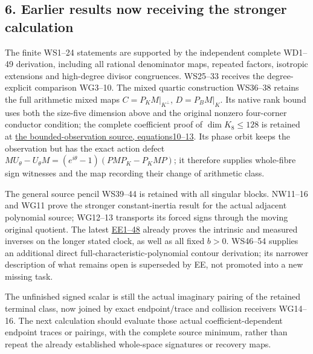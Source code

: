 \documentclass[11pt]{article}
\begin{document}
\subsection{6. Earlier results now receiving the stronger calculation}\label{part1-earlier-results-now-receiving-the-stronger-calculation}

The finite WS1--24 statements are supported by the independent complete WD1--49 derivation, including all rational denominator maps, repeated factors, isotropic extensions and high-degree divisor congruences. WS25--33 receives the degree-explicit comparison WG3--10. The mixed quartic construction WS36--38 retains the full arithmetic mixed maps \(C=P_KM|_{K^\perp}\), \(D=P_BM|_K\). Its native rank bound uses both the size-five dimension above and the original nonzero four-corner conductor condition; the complete coefficient proof of \(\dim K_8\le128\) is retained at \href{https://github.com/KokunoYumeto/zeta-function-research-reader/blob/4ba9285b66af58a6d58fc502a494c1fb45ca5b79/workbenches/splitzero-tandem/continuations/20260922-support-transport/RETAINED_COMPLETE_PROOF_SOURCES.tex\#L332958}{the bounded-observation source, equations10--13}. Its phase orbit keeps the observation but has the exact action defect \(MU_\theta-U_\theta M=(e^{i\theta}-1)(PM P_K-P_KMP)\); it therefore supplies whole-fibre sign witnesses and the map recording their change of arithmetic class.

The general source pencil WS39--44 is retained with all singular blocks. NW11--16 and WG11 prove the stronger constant-inertia result for the actual adjacent polynomial source; WG12--13 transports its forced signs through the moving original quotient. The latest \href{https://github.com/KokunoYumeto/zeta-function-research-reader/blob/4ba9285b66af58a6d58fc502a494c1fb45ca5b79/workbenches/splitzero-tandem/continuations/20260922-support-transport/EVOLUTION_EXTENSION_PROOF.md}{EE1--48} already proves the intrinsic and measured inverses on the longer stated clock, as well as all fixed \(b>0\). WS46--54 supplies an additional direct full-characteristic-polynomial contour derivation; its narrower description of what remains open is superseded by EE, not promoted into a new missing task.

The unfinished signed scalar is still the actual imaginary pairing of the retained terminal class, now joined by exact endpoint/trace and collision receivers WG14--16. The next calculation should evaluate those actual coefficient-dependent endpoint traces or pairings, with the complete source minimum, rather than repeat the already established whole-space signatures or recovery maps.
\end{document}
